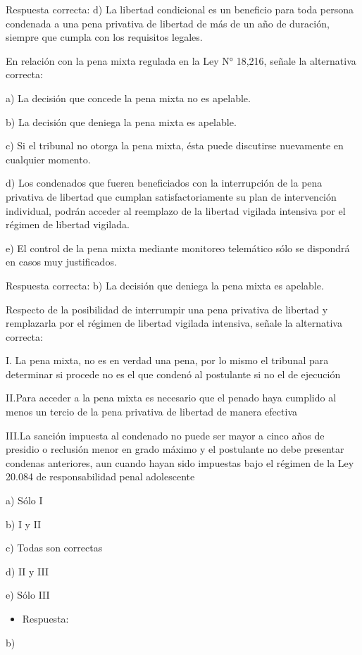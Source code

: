 \documentclass[letterpaper, 11pt]{article}
\begin{document}
Respuesta correcta:
d) La libertad condicional es un beneficio para toda persona
condenada a una pena privativa de libertad de más de un año de duración, siempre
que cumpla con los requisitos legales.

En relación con la pena mixta regulada en la Ley N° 18,216, señale la alternativa
correcta:

a) La decisión que concede la pena mixta no es apelable.

b) La decisión que deniega la pena mixta es apelable.

c) Si el tribunal no otorga la pena mixta, ésta puede discutirse nuevamente en cualquier
momento.

d) Los condenados que fueren beneficiados con la interrupción de la pena privativa de
libertad que cumplan satisfactoriamente su plan de intervención individual, podrán acceder
al reemplazo de la libertad vigilada intensiva por el régimen de libertad vigilada.

e) El control de la pena mixta mediante monitoreo telemático sólo se dispondrá en casos
muy justificados.

Respuesta correcta:
b) La decisión que deniega la pena mixta es apelable.


Respecto de la posibilidad de interrumpir una pena privativa de libertad y
remplazarla por el régimen de libertad vigilada intensiva, señale la alternativa
correcta:

I. La pena mixta, no es en verdad una pena, por lo mismo el tribunal para determinar
si procede no es el que condenó al postulante si no el de ejecución

II.Para acceder a la pena mixta es necesario que el penado haya cumplido al menos
un tercio de la pena privativa de libertad de manera efectiva

III.La sanción impuesta al condenado no puede ser mayor a cinco años
de presidio o reclusión menor en grado máximo y el postulante no debe
presentar condenas anteriores, aun cuando hayan sido impuestas bajo el
régimen de la Ley 20.084 de responsabilidad penal adolescente


a) Sólo I

b) I y II

c) Todas son correctas

d) II y III

e) Sólo III

\begin{itemize}
\item Respuesta:
\end{itemize}
b)
\end{document}
